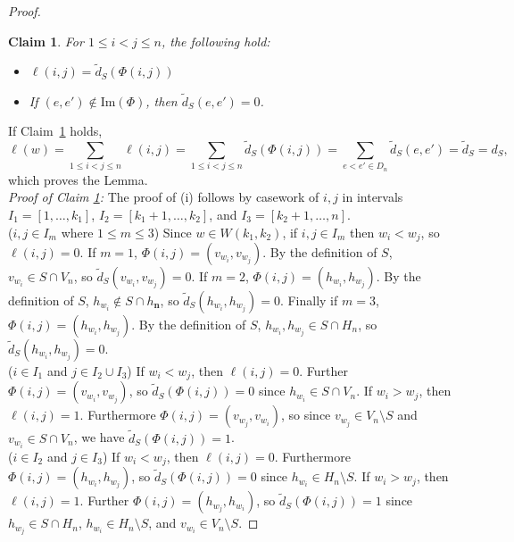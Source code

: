 \documentclass{amsart}
\newtheorem{clm}{Claim}
\newcommand{\bfn}{\mathbf{n}}
\renewcommand{\Im}{\mathrm{Im}}
\begin{document}
\begin{proof}
    \begin{clm}
      \label{clm:pairMatch}
      For $1\leq i<j\leq n$,  the following hold:
      \begin{itemize}
        \item[(i)] $\ell(i,j)=\widetilde{d}_S(\Phi(i,j))$
        \item[(ii)] If $(e,e')\notin\Im(\Phi)$, then $\widetilde{d}_S(e,e')=0$.
      \end{itemize}
    \end{clm}

    If Claim~\ref{clm:pairMatch} holds, 
    \[\ell(w)=\sum\limits_{1\leq i<j\leq n} \ell(i,j)=\sum\limits_{1\leq i<j\leq n} \widetilde{d}_S(\Phi(i,j))=\sum\limits_{e<e'\in D_n} \widetilde{d}_S(e,e')=\widetilde{d}_S={d}_S,\]
    which proves the Lemma.\\

    \noindent\emph{Proof of Claim \ref{clm:pairMatch}:}
    The proof of (i) follows by casework of $i,j$ in intervals $I_1=[1,\ldots,k_1]$, $I_2=[k_1+1,\ldots,k_2]$, and $I_3=[k_2+1,\ldots,n]$.\\ 

    ($i,j\in I_m$ where $1\leq m\leq 3$) 
    Since $w\in W(k_1,k_2)$, if $i,j\in I_m$ then $w_i<w_j$, so $\ell(i,j)=0$. 
    If $m=1$, $\Phi(i,j)=(v_{w_i},v_{w_j})$. 
    By the definition of $S$, $v_{w_i}\in S\cap V_n$, so $\widetilde{d}_S(v_{w_i},v_{w_j})=0$.
    If $m=2$, $\Phi(i,j)=(h_{w_i},h_{w_j})$. 
    By the definition of $S$, $h_{w_i}\notin S\cap h_\bfn$, so $\widetilde{d}_S(h_{w_i},h_{w_j})=0$.
    Finally if $m=3$, $\Phi(i,j)=(h_{w_i},h_{w_j})$. 
    By the definition of $S$, $h_{w_i},h_{w_j}\in S\cap H_n$, so $\widetilde{d}_S(h_{w_i},h_{w_j})=0$.\\

    ($i\in I_1$ and $j\in I_{2}\cup I_3$)
    If $w_i<w_j$, then $\ell(i,j)=0$.
    Further $\Phi(i,j)=(v_{w_i},v_{w_j})$, so $\widetilde{d}_S(\Phi(i,j))=0$ since $h_{w_i}\in S\cap V_n$.
    If $w_i>w_j$, then $\ell(i,j)=1$.
    Furthermore $\Phi(i,j)=(v_{w_j},v_{w_i})$, so since $v_{w_j}\in V_n\setminus S$ and $v_{w_i}\in S\cap V_n$, we have $\widetilde{d}_S(\Phi(i,j))=1$.\\

    ($i\in I_2$ and $j\in I_{3}$)
    If $w_i<w_j$, then $\ell(i,j)=0$.
    Furthermore $\Phi(i,j)=(h_{w_i},h_{w_j})$, so $\widetilde{d}_S(\Phi(i,j))=0$ since $h_{w_i}\in H_n\setminus S$.
    If $w_i>w_j$, then $\ell(i,j)=1$.
    Further $\Phi(i,j)=(h_{w_j},h_{w_i})$, so $\widetilde{d}_S(\Phi(i,j))=1$ since $h_{w_j}\in S\cap H_n$, $h_{w_i}\in H_n\setminus S$, and $v_{w_i}\in V_n\setminus S$.


\end{proof}
\end{document}
